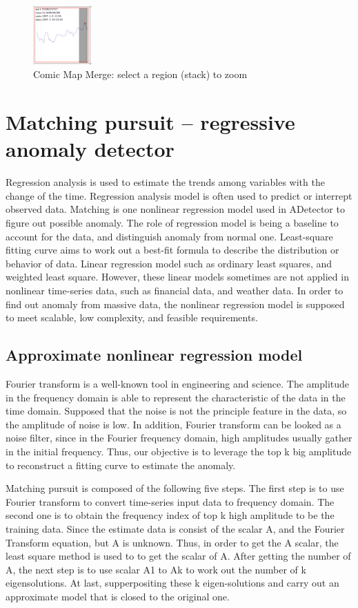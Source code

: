\documentclass{vgtc}                          %
\begin{document}
 \begin{figure}[htb]
	\centering
  \includegraphics[width=0.20\textwidth]{zoom.jpg}
  \caption{Comic Map Merge: select a region (stack) to zoom}
\end{figure}

\section{Matching pursuit -- regressive anomaly detector}

Regression analysis is used to estimate the trends among variables with the change of the time. Regression analysis model is often used to predict or interrept observed data. Matching is one nonlinear regression model used in ADetector to figure out possible anomaly. The role of regression model is being a baseline to account for the data, and distinguish anomaly from normal one. Least-square fitting curve aims to work out a best-fit formula to describe the distribution or behavior of data. Linear regression model such as ordinary least squares, and weighted least square. However, these linear models sometimes are not applied in nonlinear time-series data, such as financial data, and weather data. In order to find out anomaly from massive data, the nonlinear regression model is supposed to meet scalable, low complexity, and feasible requirements.

\subsection{Approximate nonlinear regression model}

Fourier transform is a well-known tool in engineering and science. The amplitude in the frequency domain is able to represent the characteristic of the data in the time domain. Supposed that the noise is not the principle feature in the data, so the amplitude of noise is low. In addition, Fourier transform can be looked as a noise filter, since in the Fourier frequency domain, high amplitudes usually gather in the initial frequency. Thus, our objective is to leverage the top k big amplitude to reconstruct a fitting curve to estimate the anomaly. 

Matching pursuit is composed of the following five steps. The first step is to use Fourier transform to convert time-series input data to frequency domain. The second one is to obtain the frequency index of top k high amplitude to be the training data. Since the estimate data is consist of the scalar A, and the Fourier Transform equation, but A is unknown. Thus, in order to get the A scalar, the least square method is used to to get the scalar of A. After getting the number of A, the next step is to use scalar A1 to Ak to work out the number of k eigensolutions. At last, supperpositing these k eigen-solutions and carry out an approximate model that is closed to the original one.
\end{document}
